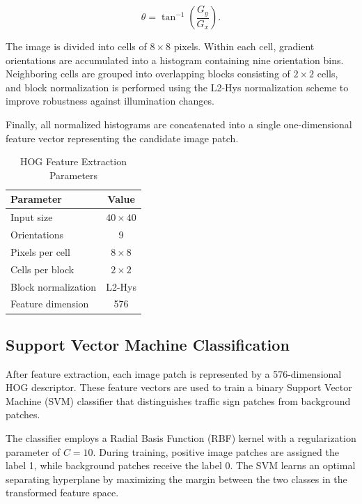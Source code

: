 \documentclass[11pt,a4paper,twoside]{article}
\begin{document}
\begin{equation}
\theta=\tan^{-1}\left(\frac{G_y}{G_x}\right).
\end{equation}

The image is divided into cells of $8\times8$ pixels. Within each cell, gradient orientations are accumulated into a histogram containing nine orientation bins. Neighboring cells are grouped into overlapping blocks consisting of $2\times2$ cells, and block normalization is performed using the L2-Hys normalization scheme to improve robustness against illumination changes.

Finally, all normalized histograms are concatenated into a single one-dimensional feature vector representing the candidate image patch.
\begin{table}[ht]
\centering
\caption{HOG Feature Extraction Parameters}
\label{tab:hog}
\begin{tabular}{lc}
\hline
Parameter & Value\\
\hline
Input size & $40\times40$\\
Orientations & 9\\
Pixels per cell & $8\times8$\\
Cells per block & $2\times2$\\
Block normalization & L2-Hys\\
Feature dimension & 576\\
\hline
\end{tabular}
\end{table}
\subsection{Support Vector Machine Classification}

After feature extraction, each image patch is represented by a 576-dimensional HOG descriptor. These feature vectors are used to train a binary Support Vector Machine (SVM) classifier that distinguishes traffic sign patches from background patches.

The classifier employs a Radial Basis Function (RBF) kernel with a regularization parameter of $C=10$. During training, positive image patches are assigned the label 1, while background patches receive the label 0. The SVM learns an optimal separating hyperplane by maximizing the margin between the two classes in the transformed feature space.
\end{document}
